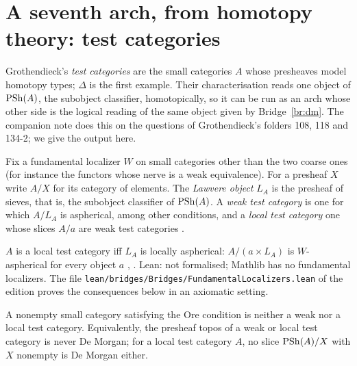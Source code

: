 \section{A seventh arch, from homotopy theory: test categories}\label{sec:homotopical}

Grothendieck's \emph{test categories} are the small categories $A$ whose presheaves model homotopy types; $\Delta$ is the first example. Their characterisation reads one object of $\mathrm{PSh}(A)$, the subobject classifier, homotopically, so it can be run as an arch whose other side is the logical reading of the same object given by Bridge~\ref{br:dm}. The companion note \cite[section ]{bridges-notes} does this on the questions of Grothendieck's folders 108, 118 and 134-2; we give the output here.

Fix a fundamental localizer $W$ on small categories other than the two coarse ones (for instance the functors whose nerve is a weak equivalence). For a presheaf $X$ write $A/X$ for its category of elements. The \emph{Lawvere object} $L_A$ is the presheaf of sieves, that is, the subobject classifier of $\mathrm{PSh}(A)$. A \emph{weak test category} is one for which $A/L_A$ is aspherical, among other conditions, and a \emph{local test category} one whose slices $A/a$ are weak test categories \cite[Déf.~4.1.8, 4.1.12]{cisinski-308}.

\begin{bridge}\label{br:test}
$A$ is a local test category iff $L_A$ is locally aspherical: $A/(a\times L_A)$ is $W$-aspherical for every object $a$ \cite[Th.~4.1.19]{cisinski-308}, \cite[Th.~1.5.6]{maltsiniotis-301}. Lean: not formalised; Mathlib has no fundamental localizers. The file \texttt{lean/bridges/Bridges/FundamentalLocalizers.lean} of the edition proves the consequences below in an axiomatic setting.
\end{bridge}

\begin{theorem}\label{th:testore}
A nonempty small category satisfying the Ore condition is neither a weak nor a local test category. Equivalently, the presheaf topos of a weak or local test category is never De Morgan; for a local test category $A$, no slice $\mathrm{PSh}(A)/X$ with $X$ nonempty is De Morgan either.
\end{theorem}


